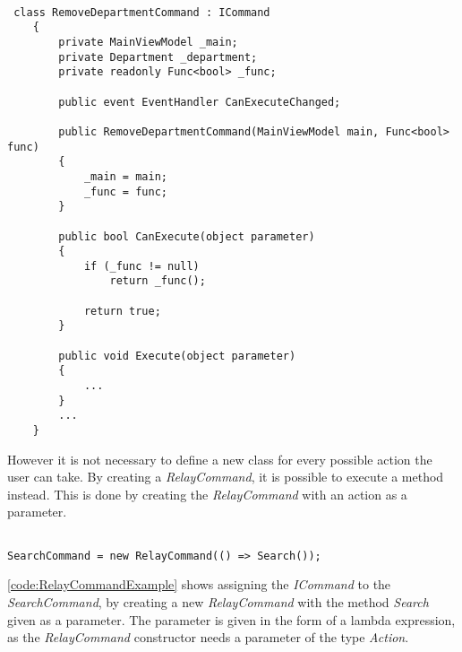 \begin{listing}[H]
\begin{verbatim}

 class RemoveDepartmentCommand : ICommand
    {
        private MainViewModel _main;
        private Department _department;
        private readonly Func<bool> _func;

        public event EventHandler CanExecuteChanged;

        public RemoveDepartmentCommand(MainViewModel main, Func<bool> func)
        {
            _main = main;
            _func = func;
        }

        public bool CanExecute(object parameter)
        {
            if (_func != null)
                return _func();

            return true;
        }

        public void Execute(object parameter)
        {
            ...
        }
        ...
    }

\end{verbatim}
\label{code:RemoveDepartmentCommandExample}
\end{listing}

However it is not necessary to define a new class for every possible action the user can take. By creating a \textit{RelayCommand}, it is possible to execute a method instead. This is done by creating the \textit{RelayCommand} with an action as a parameter.
\\

\begin{listing}[H]
\begin{verbatim}

SearchCommand = new RelayCommand(() => Search());

\end{verbatim}
\label{code:RelayCommandExample}
\end{listing}

\autoref{code:RelayCommandExample} shows assigning the \textit{ICommand} to the \textit{SearchCommand}, by creating a new \textit{RelayCommand} with the method \textit{Search} given as a parameter. The parameter is given in the form of a lambda expression, as the \textit{RelayCommand} constructor needs a parameter of the type \textit{Action}. 
\par

